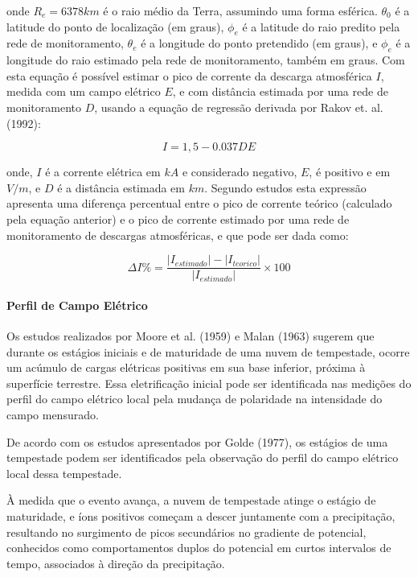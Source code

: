 \documentclass[a4paper, 12pt, onecolumn,singlespacing]{article}
\begin{document}
		onde $R_e = 6378 km$ é o raio médio da Terra, assumindo uma forma esférica. $\theta_0$ é a latitude do ponto de localização (em graus), $\phi_e$ é a latitude do raio predito pela rede de monitoramento, $\theta_e$ é a longitude do ponto pretendido (em graus), e $\phi_e$ é a longitude do raio estimado pela rede de monitoramento, também em graus.
		Com esta equação é possível estimar o pico de corrente da descarga atmosférica $I$, medida com um campo elétrico $E$, e com distância estimada por uma rede de monitoramento $D$, usando a equação de regressão derivada por Rakov et. al. (1992):
		
		\begin{equation}
			I = 1,5 - 0.037 DE
		\end{equation}
	
		onde, $I$ é a corrente elétrica em $kA$ e considerado negativo, $E$, é positivo e em $V/m$, e $D$ é a distância estimada em $km$. Segundo estudos esta expressão apresenta uma diferença percentual entre o pico de corrente teórico (calculado pela equação anterior) e o pico de corrente estimado por uma rede de monitoramento de descargas atmosféricas, e que
		pode ser dada como:
		
		\begin{equation}
			\Delta I\% = \frac{\left|I_{estimado}\right| - \left|I_{teorico}\right|}{\left|I_{estimado}\right|} \times 100
		\end{equation}
	
		\paragraph{Perfil de Campo Elétrico}
		
		Os estudos realizados por Moore et al. (1959) e Malan (1963) sugerem que durante os estágios iniciais e de maturidade de uma nuvem de tempestade, ocorre um acúmulo de cargas elétricas positivas em sua base inferior, próxima à superfície terrestre. Essa eletrificação inicial pode ser identificada nas medições do perfil do campo elétrico local pela mudança de polaridade na intensidade do campo mensurado.
		
		De acordo com os estudos apresentados por Golde (1977), os estágios de uma tempestade podem ser identificados pela observação do perfil do campo elétrico local dessa tempestade.
		
		À medida que o evento avança, a nuvem de tempestade atinge o estágio de maturidade, e íons positivos começam a descer juntamente com a precipitação, resultando no surgimento de picos secundários no gradiente de potencial, conhecidos como comportamentos duplos do potencial em curtos intervalos de tempo, associados à direção da precipitação.
		
\end{document}
